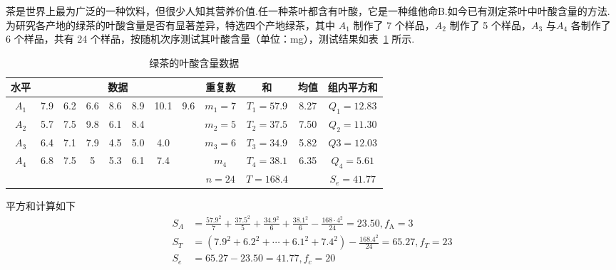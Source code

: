 \begin{example}\label{exam:8.3.2}
茶是世界上最为广泛的一种饮料，但很少人知其营养价值.任一种茶叶都含有叶酸，它是一种维他命B.如今已有测定茶叶中叶酸含量的方法.为研究各产地的绿茶的叶酸含量是否有显著差异，特选四个产地绿茶，其中 $A_1$ 制作了 7 个样品，$A_2$ 制作了 5 个样品，$A_3$ 与$A_4$ 各制作了 6 个样品，共有 24 个样品，按随机次序测试其叶酸含量（单位：\si{mg}），测试结果如表~\ref{tab:8.3.3} 所示.

\begin{table}[htbp]
  \centering
  \caption{绿茶的叶酸含量数据}
  \begin{tabular}{cccccccccccc}
    \toprule
    \multicolumn{1}{c|}{水平} & \multicolumn{7}{c|}{数据}                               & 重复数   & 和     & 均值    & 组内平方和 \\
    \midrule
    \multicolumn{1}{c|}{$A_1$} & 7.9   & 6.2   & 6.6   & 8.6   & 8.9   & 10.1  & \multicolumn{1}{c|}{9.6} & $m_1=7$  & $T_1=57.9$ & 8.27  & $Q_1=12.83$ \\
    \multicolumn{1}{c|}{$A_2$} & 5.7   & 7.5   & 9.8   & 6.1   & 8.4   &       & \multicolumn{1}{c|}{} & $m_2=5$  & $T_2=37.5$ & 7.50   & $Q_2=11.30$ \\
    \multicolumn{1}{c|}{$A_3$} & 6.4   & 7.1   & 7.9   & 4.5   & 5.0     & 4.0     & \multicolumn{1}{c|}{} & $m_3=6$  & $T_3=34.9$ & 5.82  & $Q3=12.03$ \\
    \multicolumn{1}{c|}{$A_4$} & 6.8   & 7.5   & 5     & 5.3   & 6.1   & 7.4   & \multicolumn{1}{c|}{} & $m_4$    & $T_4=38.1$ & 6.35  & $Q_4=5.61$ \\
    \midrule
    \multicolumn{8}{c}{}                                          & $n=24$  & $T=168.4$ &       & $S_e=41.77$ \\
    \bottomrule
    \end{tabular}%
  \label{tab:8.3.3}%
\end{table}%
平方和计算如下
\begin{equation*}
  \begin{split}
  S_{A}&=\frac{57.9^{2}}{7}+\frac{37.5^{2}}{5}+\frac{34.9^{2}}{6}+\frac{38.1^{2}}{6}-\frac{168 \cdot 4^{2}}{24}=23.50, f_{\mathrm{A}}=3\\
  S_{T}&=\left(7.9^{2}+6.2^{2}+\cdots+6.1^{2}+7.4^{2}\right)-\frac{168.4^{2}}{24}=65.27, f_{T}=23 \\
  S_{e}&=65.27-23.50=41.77, f_{c}=20
  \end{split}
\end{equation*}


\end{example}
